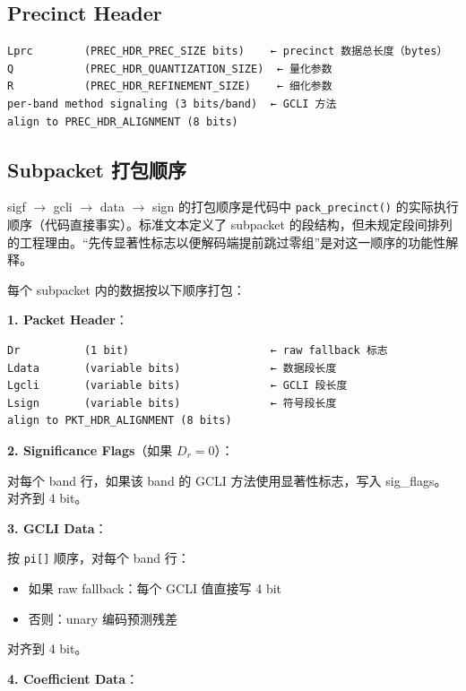\subsection{Precinct Header}

\begin{lstlisting}[numbers=none]
Lprc        (PREC_HDR_PREC_SIZE bits)    ← precinct 数据总长度（bytes）
Q           (PREC_HDR_QUANTIZATION_SIZE)  ← 量化参数
R           (PREC_HDR_REFINEMENT_SIZE)    ← 细化参数
per-band method signaling (3 bits/band)  ← GCLI 方法
align to PREC_HDR_ALIGNMENT (8 bits)
\end{lstlisting}

\subsection{Subpacket 打包顺序}

\begin{engineeringnote}
sigf $\to$ gcli $\to$ data $\to$ sign 的打包顺序是代码中 \texttt{pack\_precinct()} 的实际执行顺序（代码直接事实）。标准文本定义了 subpacket 的段结构，但未规定段间排列的工程理由。``先传显著性标志以便解码端提前跳过零组''是对这一顺序的功能性解释。
\end{engineeringnote}

每个 subpacket 内的数据按以下顺序打包：

\textbf{1. Packet Header}：
\begin{lstlisting}[numbers=none]
Dr          (1 bit)                      ← raw fallback 标志
Ldata       (variable bits)              ← 数据段长度
Lgcli       (variable bits)              ← GCLI 段长度
Lsign       (variable bits)              ← 符号段长度
align to PKT_HDR_ALIGNMENT (8 bits)
\end{lstlisting}

\textbf{2. Significance Flags}（如果 $D_r = 0$）：

对每个 band 行，如果该 band 的 GCLI 方法使用显著性标志，写入 sig\_flags。对齐到 4 bit。

\textbf{3. GCLI Data}：

按 \texttt{pi[]} 顺序，对每个 band 行：
\begin{itemize}
  \item 如果 raw fallback：每个 GCLI 值直接写 4 bit
  \item 否则：unary 编码预测残差
\end{itemize}

对齐到 4 bit。

\textbf{4. Coefficient Data}：

